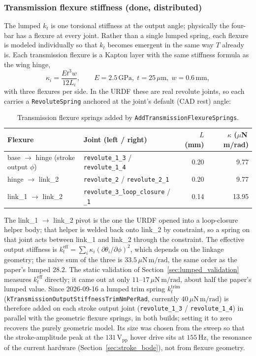 \documentclass{article}
\begin{document}
\subsubsection{Transmission flexure stiffness (done, distributed)}
The lumped \(k_t\) is one torsional stiffness at the output angle; physically the four-bar has a flexure at every joint. Rather than a single lumped spring, each flexure is modeled individually so that \(k_t\) becomes emergent in the same way \(T\) already is. Each transmission flexure is a Kapton layer with the same stiffness formula as the wing hinge,
\begin{equation}
    \kappa_i = \frac{E t^3 w}{12 L_i}, \qquad E = 2.5\,\mathrm{GPa},\; t = 25\,\mu\mathrm{m},\; w = 0.6\,\mathrm{mm},
\end{equation}
with three flexures per side. In the URDF these are real revolute joints, so each carries a \texttt{RevoluteSpring} anchored at the joint's default (CAD rest) angle:
\begin{table}[H]
\centering
\begin{tabular}{l l r r}
\hline
Flexure & Joint (left / right) & \(L\) (mm) & \(\kappa\) (\(\mu\)N\,m/rad) \\
\hline
base \(\to\) hinge (stroke output \(\phi\)) & \texttt{revolute\_1\_3} / \texttt{revolute\_1\_4} & 0.20 & 9.77 \\
hinge \(\to\) link\_2 & \texttt{revolute\_2} / \texttt{revolute\_2\_1} & 0.20 & 9.77 \\
link\_1 \(\to\) link\_2 & \texttt{revolute\_3\_loop\_closure} / \texttt{\_1} & 0.14 & 13.95 \\
\hline
\end{tabular}
\caption{Transmission flexure springs added by \texttt{AddTransmissionFlexureSprings}.}
\label{tab:transmission_flexures}
\end{table}
The link\_1 \(\to\) link\_2 pivot is the one the URDF opened into a loop-closure helper body; that helper is welded back onto link\_2 by constraint, so a spring on that joint acts between link\_1 and link\_2 through the constraint. The effective output stiffness is \(k_t^{\mathrm{eff}} = \sum_i \kappa_i (\partial\theta_i/\partial\phi)^2\), which depends on the linkage geometry; the naive sum of the three is \(33.5\,\mu\mathrm{N\,m/rad}\), the same order as the paper's lumped \(28.2\). The static validation of Section~\ref{sec:lumped_validation} measures \(k_t^{\mathrm{eff}}\) directly; it came out at only \(11\)--\(17\,\mu\mathrm{N\,m/rad}\), about half the paper's lumped value. Since 2026-09-16 a lumped trim spring \(k_t^{\mathrm{trim}}\) (\texttt{kTransmissionOutputStiffnessTrimNmPerRad}, currently \(40\,\mu\mathrm{N\,m/rad}\)) is therefore added on each stroke output joint (\texttt{revolute\_1\_3} / \texttt{revolute\_1\_4}) in parallel with the geometric flexure springs, in both builds; setting it to zero recovers the purely geometric model. Its size was chosen from the sweep so that the stroke-amplitude peak at the \(131\,\mathrm{V_{pp}}\) hover drive sits at \(155\,\mathrm{Hz}\), the resonance of the current hardware (Section~\ref{sec:stroke_bode}), not from flexure geometry.
\end{document}
